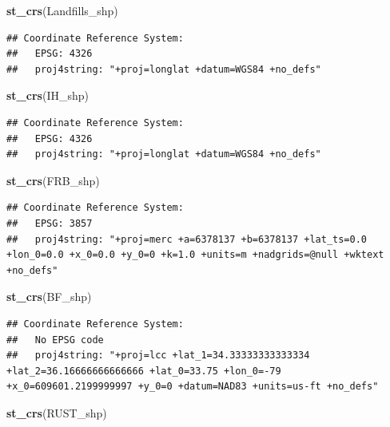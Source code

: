 \documentclass[12pt,]{article}
\newenvironment{Shaded}{\begin{snugshade}}{\end{snugshade}}
\newcommand{\KeywordTok}[1]{\textcolor[rgb]{0.13,0.29,0.53}{\textbf{#1}}}
\newcommand{\NormalTok}[1]{#1}
\begin{document}
\begin{Shaded}
\begin{Highlighting}[]
\KeywordTok{st_crs}\NormalTok{(Landfills_shp)}
\end{Highlighting}
\end{Shaded}

\begin{verbatim}
## Coordinate Reference System:
##   EPSG: 4326 
##   proj4string: "+proj=longlat +datum=WGS84 +no_defs"
\end{verbatim}

\begin{Shaded}
\begin{Highlighting}[]
\KeywordTok{st_crs}\NormalTok{(IH_shp)}
\end{Highlighting}
\end{Shaded}

\begin{verbatim}
## Coordinate Reference System:
##   EPSG: 4326 
##   proj4string: "+proj=longlat +datum=WGS84 +no_defs"
\end{verbatim}

\begin{Shaded}
\begin{Highlighting}[]
\KeywordTok{st_crs}\NormalTok{(FRB_shp)}
\end{Highlighting}
\end{Shaded}

\begin{verbatim}
## Coordinate Reference System:
##   EPSG: 3857 
##   proj4string: "+proj=merc +a=6378137 +b=6378137 +lat_ts=0.0 +lon_0=0.0 +x_0=0.0 +y_0=0 +k=1.0 +units=m +nadgrids=@null +wktext +no_defs"
\end{verbatim}

\begin{Shaded}
\begin{Highlighting}[]
\KeywordTok{st_crs}\NormalTok{(BF_shp)}
\end{Highlighting}
\end{Shaded}

\begin{verbatim}
## Coordinate Reference System:
##   No EPSG code
##   proj4string: "+proj=lcc +lat_1=34.33333333333334 +lat_2=36.16666666666666 +lat_0=33.75 +lon_0=-79 +x_0=609601.2199999997 +y_0=0 +datum=NAD83 +units=us-ft +no_defs"
\end{verbatim}

\begin{Shaded}
\begin{Highlighting}[]
\KeywordTok{st_crs}\NormalTok{(RUST_shp)}
\end{Highlighting}
\end{Shaded}
\end{document}
